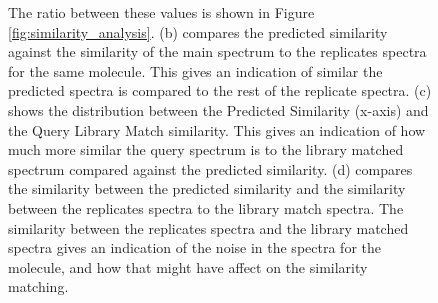 \begin{figure}[h]
{     The ratio between these values is shown in Figure \ref{fig:similarity_analysis}.
    (b) compares the predicted similarity against the similarity of the main spectrum
    to the replicates spectra for the same molecule. This gives an indication of
    similar the predicted spectra is compared to the rest of the replicate spectra.
    (c) shows the distribution between the Predicted Similarity (x-axis) and the
    Query Library Match similarity. This gives an indication of how much more similar
    the query spectrum is to the library matched spectrum compared against
    the predicted similarity.
    (d) compares the similarity between the predicted similarity and the similarity
    between the replicates spectra to the library match spectra. The similarity between
    the replicates spectra and the library matched spectra gives an indication of the noise
    in the spectra for the molecule, and how that might have affect on the similarity matching.
    }
\end{figure}
